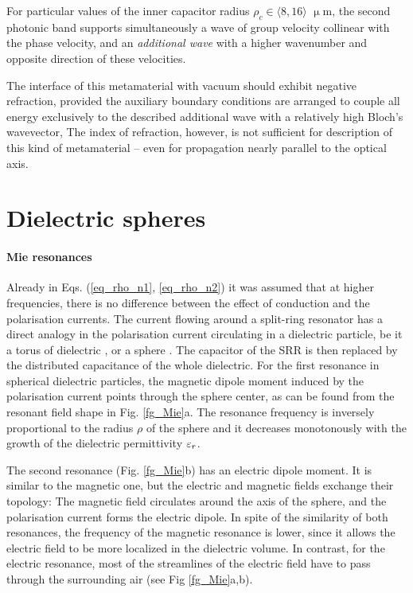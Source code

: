 For particular values of the inner capacitor radius $\rho_c \in \langle8,16\rangle$ $\upmu$m, the second photonic band supports simultaneously a wave of group velocity collinear with the phase velocity, and an \textit{additional wave} with a higher wavenumber and opposite direction of these velocities. 

The interface of this metamaterial with vacuum should exhibit negative refraction, provided the auxiliary boundary conditions are arranged to couple all energy exclusively to the described additional wave with a relatively high Bloch's wavevector,  The index of refraction, however, is not sufficient for description of this kind of metamaterial -- even for propagation nearly parallel to the optical axis.

\FloatBarrier %
\section{Dielectric spheres} %
\paragraph{Mie resonances}%
Already in Eqs. (\ref{eq_rho_n1}, \ref{eq_rho_n2}) it was assumed that at higher frequencies, there is no difference between the effect of conduction and the polarisation currents. The current flowing around a split-ring resonator has a direct analogy in the polarisation current circulating in a dielectric particle, be it a torus of dielectric \cite{jelinek2009artificial}, or a sphere \cite{obrien2002photonic}. The capacitor of the SRR is then replaced by the distributed capacitance of the whole dielectric. For the first resonance in spherical dielectric particles, the magnetic dipole moment induced by the polarisation current points through the sphere center, as can be found from the resonant field shape in Fig. \ref{fg_Mie}a. The resonance frequency is inversely proportional to the radius $\rho$ of the sphere and it decreases monotonously with the growth of the dielectric permittivity $\varepsilon_r$.

The second resonance (Fig. \ref{fg_Mie}b) has an electric dipole moment. It is similar to the magnetic one, but the electric and magnetic fields exchange their topology: The magnetic field circulates around the axis of the sphere, and the polarisation current forms the electric dipole. In spite of the similarity of both resonances, the frequency of the magnetic resonance is lower, since it allows the electric field to be more localized in the dielectric volume. In contrast, for the electric resonance, most of the streamlines of the electric field have to pass through the surrounding air (see Fig \ref{fg_Mie}a,b).  %

